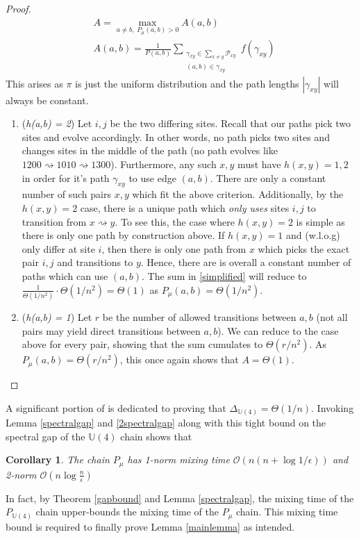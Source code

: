 \documentclass[12pt]{amsart}
\newtheorem{corollary}{Corollary}[theorem]
\theoremstyle{definition}
\theoremstyle{remark}
\numberwithin{equation}{section}
\theoremstyle{remark}
\begin{document}
\begin{proof}
  \begin{align} \label{simplified}
    & A = \max_{a \neq b, \; P_\mu(a,b) > 0} A(a,b) \\
    & A(a,b) = \frac{1}{P(a,b)}\sum_{\substack{\gamma_{xy} \in \sum_{x \neq y}\mathcal{P}_{xy} \\
    (a,b) \in \gamma_{xy}}} f(\gamma_{xy})
  \end{align}
  This arises as $\pi$ is just the uniform distribution and the path lengths $|\gamma_{xy}|$ will always be constant.
  \begin{enumerate}
    \item (\emph{h(a,b) = 2}) Let $i,j$ be the two differing sites. Recall that our paths pick two sites and evolve accordingly. In other words, no path picks two sites and changes sites in the middle of the path (no path evolves like $1200 \rightsquigarrow 1010 \rightsquigarrow 1300$). Furthermore, any such $x,y$ must have $ h(x,y) = 1,2$ in order for it's path $\gamma_{xy}$ to use edge $(a,b)$. There are only a constant number of such pairs $x,y$ which fit the above criterion. Additionally, by the $h(x,y) =2$ case, there is a unique path which \emph{only uses} sites $i,j$ to transition from $x \rightsquigarrow y$. To see this, the case where $h(x,y) = 2$ is simple as there is only one path by construction above. If $h(x,y) = 1$ and (w.l.o.g) only differ at site $i$, then there is only one path from $x$ which picks the exact pair $i,j$ and transitions to $y$. Hence, there are is overall a constant number of paths which can use $(a,b)$. The sum in \ref{simplified} will reduce to $\frac{1}{\Theta(1/n^2)} \cdot \Theta(1/n^2) = \Theta(1)$ as $P_\mu(a,b) = \Theta(1/n^2)$.
    \item (\emph{h(a,b) = 1}) Let $r$ be the number of allowed transitions between $a,b$ (not all pairs may yield direct transitions between $a,b$). We can reduce to the case above for every pair, showing that the sum cumulates to $\Theta(r/n^2)$. As $P_\mu(a,b) = \Theta(r/n^2)$, this once again shows that $A = \Theta(1)$.
  \end{enumerate}
\end{proof}

A significant portion of \cite{harrlow} is dedicated to proving that $\Delta_{\mathbb{U}(4)} = \Theta(1/n)$. Invoking Lemma \ref{spectralgap} and \ref{2spectralgap} along with this tight bound on the spectral gap of the $\mathbb{U}(4)$ chain shows that
%
\begin{corollary} \label{muchainmix}
  The chain $P_\mu$ has 1-norm mixing time $\mathcal{O}(n(n+\log1/\epsilon))$ and 2-norm $\mathcal{O}(n\log\frac{n}{\epsilon})$
\end{corollary}
In fact, by Theorem \ref{gapbound} and Lemma \ref{spectralgap}, the mixing time of the $P_{\mathbb{U}(4)}$ chain upper-bounds the mixing time of the $P_{\mu}$ chain. This mixing time bound is required to finally prove Lemma \ref{mainlemma} as intended.
\end{document}
